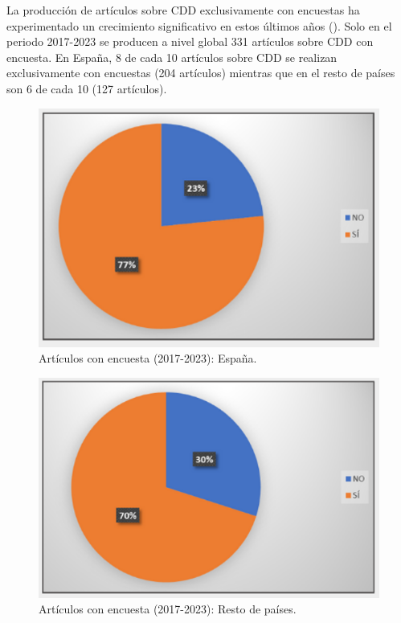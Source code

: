 \documentclass[spanish]{textolivre}
\begin{document}
La producción de artículos sobre CDD exclusivamente con encuestas ha experimentado un crecimiento significativo en estos últimos años (). Solo en el periodo 2017-2023 se producen a nivel global 331 artículos sobre CDD con encuesta. En España, 8 de cada 10 artículos sobre CDD se realizan exclusivamente con encuestas (204 artículos) mientras que en el resto de países son 6 de cada 10 (127 artículos). 

\noindent
\begin{minipage}[b]{0.46\textwidth}
    \begin{figure}[H]
        \centering
        \includegraphics[width=\linewidth]{images/IMAGE9.png}
        \caption{Artículos con encuesta (2017-2023): España.}
        \label{fig-9}
    \end{figure}
\end{minipage}
\hfill
\begin{minipage}[b]{0.50\textwidth}
    \begin{figure}[H]
        \centering
        \includegraphics[width=\linewidth]{images/IMAGE10.png}
        \caption{Artículos con encuesta (2017-2023): Resto de países.}
        \label{fig-10}
    \end{figure}
\end{minipage}
\bigskip
\end{document}
